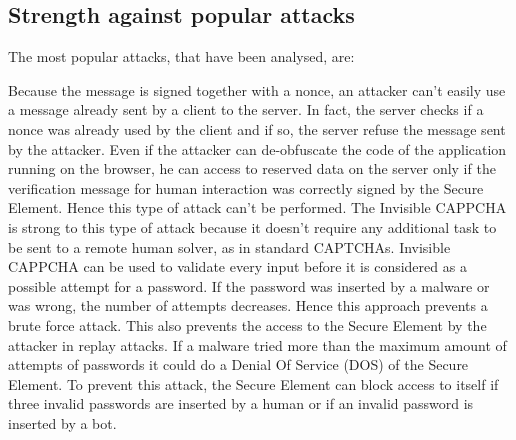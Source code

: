 \subsection{Strength against popular attacks}\label{inv:attacks}
The most popular attacks, that have been analysed, are\cite{Invisible_CAPPCHA}:
\begin{itemize}
{Because the message is signed together with a nonce, an attacker can't easily use a message already sent by a client to the server. In fact, the server checks if a nonce was already used by the client and if so, the server refuse the message sent by the attacker.
}
{Even if the attacker can de-obfuscate the code of the application running on the browser, he can access to reserved data on the server only if the verification message for human interaction was correctly signed by the Secure Element. Hence this type of attack can't be performed.}
{The Invisible CAPPCHA is strong to this type of attack because it doesn't require any additional task to be sent to a remote human solver, as in standard CAPTCHAs.}
{Invisible CAPPCHA can be used to validate every input before it is considered as a possible attempt for a password. If the password was inserted by a malware or was wrong, the number of attempts decreases. Hence this approach prevents a brute force attack. This also prevents the access to the Secure Element by the attacker in replay attacks.
}
{If a malware tried more than the maximum amount of attempts of passwords it could do a Denial Of Service (DOS) of the Secure Element. To prevent this attack, the Secure Element can block access to itself if three invalid passwords are inserted by a human or if an invalid password is inserted by a bot.}
\end{itemize}